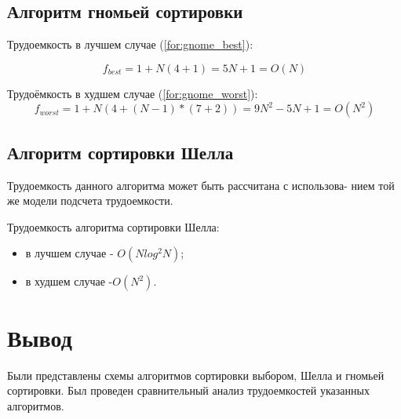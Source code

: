 \subsection{Алгоритм гномьей сортировки}

Трудоемкость в лучшем случае (\ref{for:gnome_best}):

\begin{equation}
	\label{for:gnome_best}
    f_{best} = 1 + N(4 + 1) = 5N + 1 = O(N)
\end{equation}

Трудоёмкость в худшем случае (\ref{for:gnome_worst}):
\begin{equation}
	\label{for:gnome_worst}
    f_{worst} = 1 + N(4 + (N - 1) * (7 + 2)) = 9N^2 - 5N + 1 = O(N^2)
\end{equation}

\subsection{Алгоритм сортировки Шелла}

Трудоемкость данного алгоритма может быть рассчитана с использова-
нием той же модели подсчета трудоемкости.

Трудоемкость алгоритма сортировки Шелла:

\begin{itemize}
	\item в лучшем случае - $O(Nlog^2N)$;
	\item в худшем случае -$O(N^2)$.
\end{itemize}

\section*{Вывод}

Были представлены схемы алгоритмов сортировки выбором, Шелла и гномьей сортировки. Был проведен сравнительный анализ трудоемкостей указанных алгоритмов.
